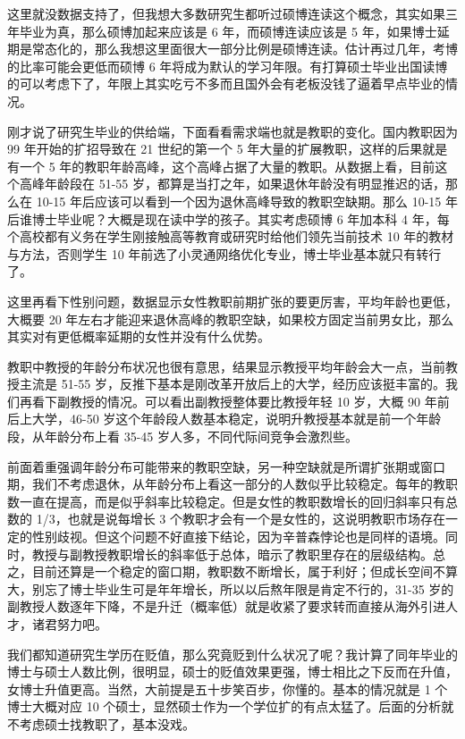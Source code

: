 \documentclass[]{tufte-book}
\begin{document}
这里就没数据支持了，但我想大多数研究生都听过硕博连读这个概念，其实如果三年毕业为真，那么硕博加起来应该是 6 年，而硕博连读应该是 5 年，如果博士延期是常态化的，那么我想这里面很大一部分比例是硕博连读。估计再过几年，考博的比率可能会更低而硕博 6 年将成为默认的学习年限。有打算硕士毕业出国读博的可以考虑下了，年限上其实吃亏不多而且国外会有老板没钱了逼着早点毕业的情况。

刚才说了研究生毕业的供给端，下面看看需求端也就是教职的变化。国内教职因为 99 年开始的扩招导致在 21 世纪的第一个 5 年大量的扩展教职，这样的后果就是有一个 5 年的教职年龄高峰，这个高峰占据了大量的教职。从数据上看，目前这个高峰年龄段在 51-55 岁，都算是当打之年，如果退休年龄没有明显推迟的话，那么在 10-15 年后应该可以看到一个因为退休高峰导致的教职空缺期。那么 10-15 年后谁博士毕业呢？大概是现在读中学的孩子。其实考虑硕博 6 年加本科 4 年，每个高校都有义务在学生刚接触高等教育或研究时给他们领先当前技术 10 年的教材与方法，否则学生 10 年前选了小灵通网络优化专业，博士毕业基本就只有转行了。

这里再看下性别问题，数据显示女性教职前期扩张的要更厉害，平均年龄也更低，大概要 20 年左右才能迎来退休高峰的教职空缺，如果校方固定当前男女比，那么其实对有更低概率延期的女性并没有什么优势。

教职中教授的年龄分布状况也很有意思，结果显示教授平均年龄会大一点，当前教授主流是 51-55 岁，反推下基本是刚改革开放后上的大学，经历应该挺丰富的。我们再看下副教授的情况。可以看出副教授整体要比教授年轻 10 岁，大概 90 年前后上大学，46-50 岁这个年龄段人数基本稳定，说明升教授基本就是前一个年龄段，从年龄分布上看 35-45 岁人多，不同代际间竞争会激烈些。

前面着重强调年龄分布可能带来的教职空缺，另一种空缺就是所谓扩张期或窗口期，我们不考虑退休，从年龄分布上看这一部分的人数似乎比较稳定。每年的教职数一直在提高，而是似乎斜率比较稳定。但是女性的教职数增长的回归斜率只有总数的 1/3，也就是说每增长 3 个教职才会有一个是女性的，这说明教职市场存在一定的性别歧视。但这个问题不好直接下结论，因为辛普森悖论也是同样的语境。同时，教授与副教授教职增长的斜率低于总体，暗示了教职里存在的层级结构。总之，目前还算是一个稳定的窗口期，教职数不断增长，属于利好；但成长空间不算大，别忘了博士毕业生可是年年增长，所以以后熬年限是肯定不行的，31-35 岁的副教授人数逐年下降，不是升迁（概率低）就是收紧了要求转而直接从海外引进人才，诸君努力吧。

我们都知道研究生学历在贬值，那么究竟贬到什么状况了呢？我计算了同年毕业的博士与硕士人数比例，很明显，硕士的贬值效果更强，博士相比之下反而在升值，女博士升值更高。当然，大前提是五十步笑百步，你懂的。基本的情况就是 1 个博士大概对应 10 个硕士，显然硕士作为一个学位扩的有点太猛了。后面的分析就不考虑硕士找教职了，基本没戏。
\end{document}
